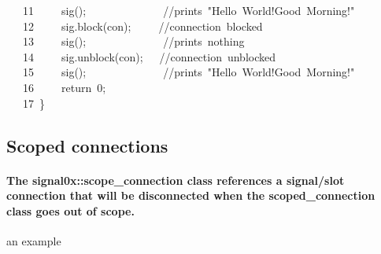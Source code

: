 \documentclass[9pt,onside,a4paper]{article}
\newcommand{\hlstd}[1]{\textcolor[rgb]{0.2,0,0.4}{#1}}
\newcommand{\hlnum}[1]{\textcolor[rgb]{0.2,0.73,0.02}{#1}}
\newcommand{\hlslc}[1]{\textcolor[rgb]{0,0.4,0.2}{#1}}
\newcommand{\hlopt}[1]{\textcolor[rgb]{0.33,0.33,0.33}{#1}}
\newcommand{\hllin}[1]{\textcolor[rgb]{0.6,0.6,0.6}{#1}}
\newcommand{\hlkwa}[1]{\textcolor[rgb]{1,0.19,0.19}{#1}}
\newcommand{\hlkwd}[1]{\textcolor[rgb]{0.82,0.11,0.93}{#1}}
\begin{document}
\hllin{\ \ \ 11\ }\hlstd{}\hlstd{\ \ \ \ }\hlstd{}\hlkwd{sig}\hlstd{}\hlopt{();}\hlstd{\ \ \ \ \ \ \ \ \ \ \ \ \ \ }\hlopt{}\hlstd{}\hlslc{//prints\ "Hello\ World!Good\ Morning!"}\\
\hllin{\ \ \ 12\ }\hlstd{}\hlstd{\ \ \ \ }\hlstd{sig}\hlopt{.}\hlstd{}\hlkwd{block}\hlstd{}\hlopt{(}\hlstd{con}\hlopt{);}\hlstd{\ \ \ \ \ }\hlopt{}\hlstd{}\hlslc{//connection\ blocked}\\
\hllin{\ \ \ 13\ }\hlstd{}\hlstd{\ \ \ \ }\hlstd{}\hlkwd{sig}\hlstd{}\hlopt{();}\hlstd{\ \ \ \ \ \ \ \ \ \ \ \ \ \ }\hlopt{}\hlstd{}\hlslc{//prints\ nothing}\\
\hllin{\ \ \ 14\ }\hlstd{}\hlstd{\ \ \ \ }\hlstd{sig}\hlopt{.}\hlstd{}\hlkwd{unblock}\hlstd{}\hlopt{(}\hlstd{con}\hlopt{);}\hlstd{\ \ \ }\hlopt{}\hlstd{}\hlslc{//connection\ unblocked}\\
\hllin{\ \ \ 15\ }\hlstd{}\hlstd{\ \ \ \ }\hlstd{}\hlkwd{sig}\hlstd{}\hlopt{();}\hlstd{\ \ \ \ \ \ \ \ \ \ \ \ \ \ }\hlopt{}\hlstd{}\hlslc{//prints\ "Hello\ World!Good\ Morning!"}\\
\hllin{\ \ \ 16\ }\hlstd{}\hlstd{\ \ \ \ }\hlstd{}\hlkwa{return\ }\hlstd{}\hlnum{0}\hlstd{}\hlopt{;}\\
\hllin{\ \ \ 17\ }\hlstd{}\hlopt{\}}\hlstd{}\\
\mbox{}
\normalfont
\normalsize






\subsection{Scoped connections}
\paragraph{The signal0x::scope\_connection class references a signal/slot connection that will be disconnected when the scoped\_connection class goes out of scope. \\}

an example \\
\end{document}
